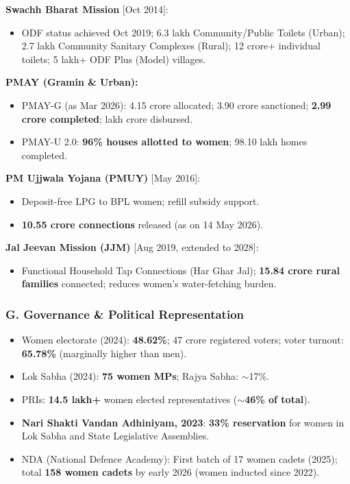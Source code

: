 \textbf{Swachh Bharat Mission} [Oct 2014]:
\begin{itemize}
  \item ODF status achieved Oct 2019; 6.3 lakh Community/Public Toilets (Urban); 2.7 lakh Community Sanitary Complexes (Rural); 12 crore+ individual toilets; 5 lakh+ ODF Plus (Model) villages.
\end{itemize}

\textbf{PMAY (Gramin \& Urban):}
\begin{itemize}
  \item PMAY-G (as Mar 2026): 4.15 crore allocated; 3.90 crore sanctioned; \textbf{2.99 crore completed};  lakh crore disbursed.
  \item PMAY-U 2.0: \textbf{96\% houses allotted to women}; 98.10 lakh homes completed.
\end{itemize}

\textbf{PM Ujjwala Yojana (PMUY)} [May 2016]:
\begin{itemize}
  \item Deposit-free LPG to BPL women; refill subsidy support.
  \item \textbf{10.55 crore connections} released (as on 14 May 2026).
\end{itemize}

\textbf{Jal Jeevan Mission (JJM)} [Aug 2019, extended to 2028]:
\begin{itemize}
  \item Functional Household Tap Connections (Har Ghar Jal); \textbf{15.84 crore rural families} connected; reduces women's water-fetching burden.
\end{itemize}

\subsubsection*{G. Governance \& Political Representation}

\begin{itemize}
  \item Women electorate (2024): \textbf{48.62\%}; 47 crore registered voters; voter turnout: \textbf{65.78\%} (marginally higher than men).
  \item Lok Sabha (2024): \textbf{75 women MPs}; Rajya Sabha: $\sim$17\%.
  \item PRIs: \textbf{14.5 lakh+} women elected representatives ($\sim$\textbf{46\% of total}).
  \item \textbf{Nari Shakti Vandan Adhiniyam, 2023}: \textbf{33\% reservation} for women in Lok Sabha and State Legislative Assemblies.
  \item NDA (National Defence Academy): First batch of 17 women cadets (2025); total \textbf{158 women cadets} by early 2026 (women inducted since 2022).
\end{itemize}

